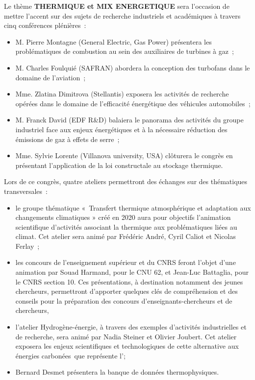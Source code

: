Le thème \textbf{THERMIQUE et MIX ENERGETIQUE} sera l'occasion de mettre l'accent sur des sujets de recherche industriels et académiques à travers cinq conférences plénières :
\begin{itemize}[label=\textbullet]
    \item M. Pierre Montagne (General Electric, Gas Power) présentera les problématiques de combustion au sein des auxiliaires de turbines à gaz ;
    \item M. Charles Foulquié (SAFRAN) abordera la conception des turbofans dans le domaine de l'aviation ;
    \item Mme. Zlatina Dimitrova (Stellantis) exposera les activités de recherche opérées dans le domaine de  l'efficacité énergétique des véhicules automobiles ;
    \item M. Franck David (EDF R\&D) balaiera le panorama des activités du groupe industriel face aux enjeux énergétiques et à la nécessaire réduction des émissions de gaz à effets de serre ;
    \item Mme. Sylvie Lorente (Villanova university, USA) clôturera le congrès en présentant l'application de la loi constructale au stockage thermique.
\end{itemize}

Lors de ce congrès, quatre ateliers permettront des échanges sur des thématiques transversales :

\begin{itemize}[label=\textbullet]
    \item le groupe thématique « Transfert thermique atmosphérique et adaptation aux changements climatiques » créé en 2020 aura pour objectifs l'animation scientifique d'activités associant la thermique aux problématiques liées au climat. Cet atelier sera animé par Frédéric André, Cyril Caliot et Nicolas Ferlay ;
    \item les concours de l'enseignement supérieur et du CNRS feront l'objet d'une animation par Souad Harmand, pour le CNU 62, et Jean-Luc Battaglia, pour le CNRS section 10. Ces présentations, à destination notamment des jeunes chercheurs, permettront d'apporter quelques clés de compréhension et des conseils pour la préparation des concours d'enseignants-chercheurs et de chercheurs,
    \item l'atelier Hydrogène-énergie, à travers des exemples d'activités industrielles et de recherche, sera animé par Nadia Steiner et Olivier Joubert. Cet atelier exposera les enjeux scientifiques et technologiques de cette alternative aux énergies carbonées que représente l';
    \item Bernard Desmet présentera la banque de données thermophysiques.
\end{itemize}

